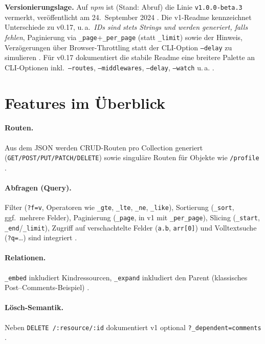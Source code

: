 \documentclass[11pt,a4paper]{article}
\begin{document}
\noindent\textbf{Versionierungslage.} Auf \emph{npm} ist (Stand: Abruf) die Linie \texttt{v1.0.0-beta.3} vermerkt, veröffentlicht am 24.\ September 2024 \cite{npm-jsonserver,depsdev-jsonserver}. Die v1-Readme kennzeichnet Unterschiede zu v0.17, u.\,a.\ \emph{IDs sind stets Strings und werden generiert, falls fehlen}, Paginierung via \texttt{\_page}+\texttt{\_per\_page} (statt \texttt{\_limit}) sowie der Hinweis, Verzögerungen über Browser-Throttling statt der CLI-Option \texttt{--delay} zu simulieren \cite[Abschnitt \enquote{Notable differences with v0.17}]{jsonserver-github-v1}. Für v0.17 dokumentiert die stabile Readme eine breitere Palette an CLI-Optionen inkl.\ \texttt{--routes}, \texttt{--middlewares}, \texttt{--delay}, \texttt{--watch} u.\,a. \cite[CLI-Übersicht]{jsonserver-github-v0}. 

\section{Features im Überblick}
\label{sec:features}
\paragraph{Routen.} Aus dem JSON werden CRUD-Routen pro Collection generiert (\texttt{GET/POST/PUT/PATCH/DELETE}) sowie singuläre Routen für Objekte wie \texttt{/profile} \cite[Abschnitt \enquote{Routes}]{jsonserver-github-v1}. 

\paragraph{Abfragen (Query).}
Filter (\texttt{?f=v}, Operatoren wie \texttt{\_gte}, \texttt{\_lte}, \texttt{\_ne}, \texttt{\_like}),
Sortierung (\texttt{\_sort}, ggf.\ mehrere Felder), Paginierung (\texttt{\_page}, in v1 mit
\texttt{\_per\_page}), Slicing (\texttt{\_start}, \texttt{\_end}/\texttt{\_limit}), Zugriff auf
verschachtelte Felder (\texttt{a.b}, \texttt{arr[0]}) und Volltextsuche (\texttt{?q=}\ldots)
sind integriert \cite[Abschnitt~\enquote{Params}]{jsonserver-github-v1}. 

\paragraph{Relationen.} \texttt{\_embed} inkludiert Kindressourcen, \texttt{\_expand} inkludiert den Parent (klassisches Post--Comments-Beispiel) \cite[Abschnitt \enquote{Embed}]{jsonserver-github-v1}. 

\paragraph{Lösch-Semantik.} Neben \texttt{DELETE /:resource/:id} dokumentiert v1 optional \texttt{?\_dependent=comments} \cite[Abschnitt \enquote{Delete}]{jsonserver-github-v1}. 
\end{document}
